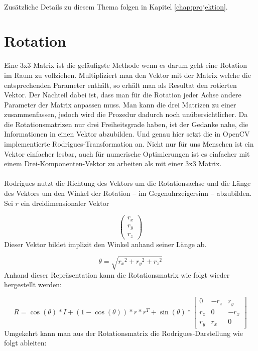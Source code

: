 \paragraph{}
Zusätzliche Details zu diesem Thema folgen in Kapitel \ref{chap:projektion}.


\section{Rotation}
Eine 3x3 Matrix ist die geläufigste Methode wenn es darum geht eine Rotation im Raum zu vollziehen. Multipliziert man den Vektor mit der Matrix welche die entsprechenden Parameter enthält, so erhält man als Resultat den rotierten Vektor. Der Nachteil dabei ist, dass man für die Rotation jeder Achse andere Parameter der Matrix anpassen muss. Man kann die drei Matrizen zu einer zusammenfassen, jedoch wird die Prozedur dadurch noch unübersichtlicher. Da die Rotationsmatrizen nur drei Freiheitsgrade haben, ist der Gedanke nahe, die Informationen in einen Vektor abzubilden. Und genau hier setzt die in OpenCV implementierte Rodrigues-Transformation an. Nicht nur für uns Menschen ist ein Vektor einfacher lesbar, auch für numerische Optimierungen ist es einfacher mit einem Drei-Komponenten-Vektor zu arbeiten als mit einer 3x3 Matrix.

\paragraph{}
Rodrigues nutzt die Richtung des Vektors um die Rotationsachse und die Länge des Vektors um den Winkel der Rotation – im Gegenuhrzeigersinn – abzubilden. Sei $r$ ein dreidimensionaler Vektor 

\begin{equation}
\begin{pmatrix} r_x \\ r_y \\ r_z \end{pmatrix}
\end{equation}
\noindent
Dieser Vektor bildet implizit den Winkel anhand seiner Länge ab.

\begin{equation}
\theta = \sqrt{{r_x}^2 + {r_y}^2 + {r_z}^2}
\end{equation}
\noindent
Anhand dieser Repräsentation kann die Rotationsmatrix wie folgt wieder hergestellt werden:

\begin{equation}
R = \cos(\theta) * I + (1 - \cos(\theta)) * r * r^T + \sin(\theta) * 
\begin{bmatrix}
0 & -r_z & r_y \\
r_z & 0 & -r_x \\
r_y & r_x & 0
\end{bmatrix}
\end{equation}
\noindent
Umgekehrt kann man aus der Rotationsmatrix die Rodrigues-Darstellung wie folgt ableiten:

